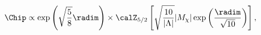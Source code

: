\begin{equation}
\label{eq:Chipdiv} \Chip \propto \exp\left( \sqrt{5\over 8} \radim
\right) \times \calZ_{5/2} \left[ \sqrt{10  \over
|\Lambda|} |M_\chi|\exp \left( {\radim \over \sqrt{10}}\right) \right] ,
\end{equation}

